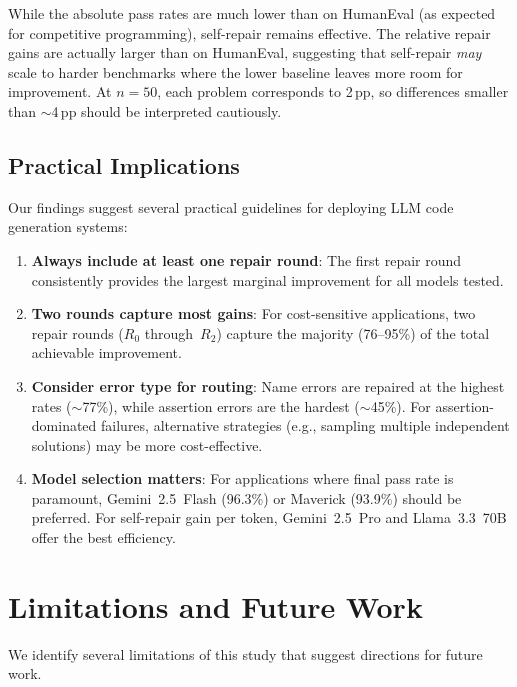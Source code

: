 \documentclass[conference]{IEEEtran}
\begin{document}
While the absolute pass rates are much lower than on HumanEval (as expected for competitive programming), self-repair remains effective. The relative repair gains are actually larger than on HumanEval, suggesting that self-repair \emph{may} scale to harder benchmarks where the lower baseline leaves more room for improvement. At $n=50$, each problem corresponds to 2\,pp, so differences smaller than $\sim$4\,pp should be interpreted cautiously.

\subsection{Practical Implications}

Our findings suggest several practical guidelines for deploying LLM code generation systems:

\begin{enumerate}
    \item \textbf{Always include at least one repair round}: The first repair round consistently provides the largest marginal improvement for all models tested.

    \item \textbf{Two rounds capture most gains}: For cost-sensitive applications, two repair rounds ($R_0$ through~$R_2$) capture the majority (76--95\%) of the total achievable improvement.

    \item \textbf{Consider error type for routing}: Name errors are repaired at the highest rates ($\sim$77\%), while assertion errors are the hardest ($\sim$45\%). For assertion-dominated failures, alternative strategies (e.g., sampling multiple independent solutions) may be more cost-effective.

    \item \textbf{Model selection matters}: For applications where final pass rate is paramount, Gemini~2.5~Flash (96.3\%) or Maverick (93.9\%) should be preferred. For self-repair gain per token, Gemini~2.5~Pro and Llama~3.3~70B offer the best efficiency.
\end{enumerate}

\section{Limitations and Future Work}
\label{sec:limitations}

We identify several limitations of this study that suggest directions for future work.
\end{document}
